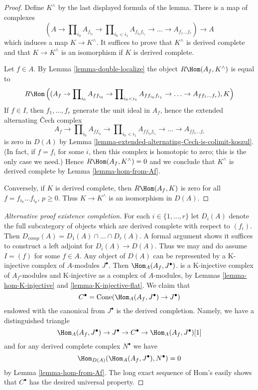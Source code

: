 \begin{proof}
Define $K^\wedge$ by the last displayed formula of the lemma.
There is a map of complexes
$$
(A \to \prod\nolimits_{i_0} A_{f_{i_0}} \to
\prod\nolimits_{i_0 < i_1} A_{f_{i_0}f_{i_1}} \to
\ldots \to A_{f_1\ldots f_r}) \longrightarrow A
$$
which induces a map $K \to K^\wedge$. It suffices to prove that
$K^\wedge$ is derived complete and that $K \to K^\wedge$ is an
isomorphism if $K$ is derived complete.

\medskip\noindent
Let $f \in A$. By Lemma \ref{lemma-double-localize}
the object $R\Hom(A_f, K^\wedge)$ is equal to
$$
R\Hom\left((A_f \to \prod\nolimits_{i_0} A_{ff_{i_0}} \to
\prod\nolimits_{i_0 < i_1} A_{ff_{i_0}f_{i_1}} \to
\ldots \to A_{ff_1\ldots f_r}), K\right)
$$
If $f \in I$, then $f_1, \ldots, f_r$ generate the
unit ideal in $A_f$, hence the extended alternating
{\v C}ech complex
$$
A_f \to \prod\nolimits_{i_0} A_{ff_{i_0}} \to
\prod\nolimits_{i_0 < i_1} A_{ff_{i_0}f_{i_1}} \to
\ldots \to A_{ff_1\ldots f_r}
$$
is zero in $D(A)$ by
Lemma \ref{lemma-extended-alternating-Cech-is-colimit-koszul}.
(In fact, if $f = f_i$ for some $i$, then this complex
is homotopic to zero; this is the only case we need.)
Hence $R\Hom(A_f, K^\wedge) = 0$ and we conclude that
$K^\wedge$ is derived complete by Lemma \ref{lemma-hom-from-Af}.

\medskip\noindent
Conversely, if $K$ is derived complete, then $R\Hom(A_f, K)$
is zero for all $f = f_{i_0} \ldots f_{i_p}$, $p \geq 0$. Thus
$K \to K^\wedge$ is an isomorphism in $D(A)$.
\end{proof}

\begin{proof}[Alternative proof existence completion]
For each $i \in \{1, \ldots, r\}$ let $D_i(A)$ denote the full
subcategory of objects which are derived complete with respect to $(f_i)$.
Then $D_{comp}(A) = D_1(A) \cap \ldots \cap D_r(A)$.
A formal argument shows it suffices to construct
a left adjoint for $D_i(A) \to D(A)$.
Thus we may and do assume $I = (f)$ for some $f \in A$.
Any object of $D(A)$ can be represented by a K-injective
complex of $A$-modules $J^\bullet$. Then $\Hom_A(A_f, J^\bullet)$.
is a K-injective complex of $A_f$-modules and
K-injective as a complex of $A$-modules, by
Lemmas \ref{lemma-hom-K-injective} and \ref{lemma-K-injective-flat}.
We claim that
$$
C^\bullet = \text{Cone}(\Hom_A(A_f, J^\bullet) \to J^\bullet)
$$
endowed with the canonical from $J^\bullet$ is the derived
completion. Namely, we have a distinguished triangle
$$
\Hom_A(A_f, J^\bullet) \to J^\bullet \to C^\bullet \to
\Hom_A(A_f, J^\bullet)[1]
$$
and for any derived complete complex $N^\bullet$ we have
$$
\Hom_{D(A)}(\Hom_A(A_f, J^\bullet), N^\bullet) = 0
$$
by Lemma \ref{lemma-hom-from-Af}. The long exact sequence of Hom's easily
shows that $C^\bullet$ has the desired universal property.
\end{proof}

